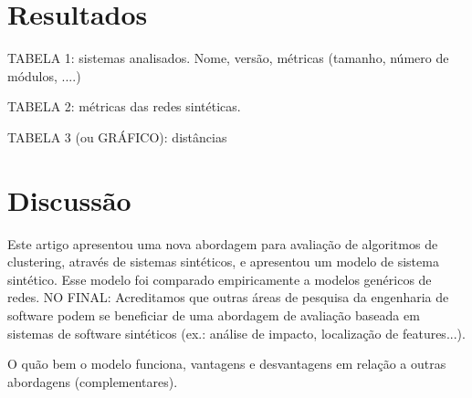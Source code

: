 \documentclass{acm_proc_article-sp}
\begin{document}


\section{Resultados} %

TABELA 1: sistemas analisados. Nome, versão, métricas (tamanho, número de módulos, ....)

TABELA 2: métricas das redes sintéticas.

TABELA 3 (ou GRÁFICO): distâncias


\section{Discussão} %

Este artigo apresentou uma nova abordagem para avaliação de algoritmos de clustering, através de sistemas sintéticos, e apresentou um modelo de sistema sintético. Esse modelo foi comparado empiricamente a modelos genéricos de redes. NO FINAL: Acreditamos que outras áreas de pesquisa da engenharia de software podem se beneficiar de uma abordagem de avaliação baseada em sistemas de software sintéticos (ex.: análise de impacto, localização de features...).





O quão bem o modelo funciona, vantagens e desvantagens em relação a outras abordagens (complementares).
\end{document}
